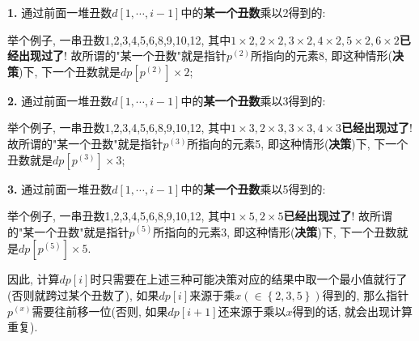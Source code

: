 \documentclass{article}
\begin{document}
\begin{homeworkProblem}
	\textbf{1.} 通过前面一堆丑数$d[1,\cdots,i-1]$中的\textbf{某一个丑数}乘以2得到的:
	
	举个例子, 一串丑数1,2,3,4,5,6,8,9,10,12, 其中$1\times 2,2\times 2, 3\times 2, 4\times 2, 5\times 2, 6 \times 2$\textbf{已经出现过了}! 故所谓的"某一个丑数"就是指针$p^{(2)}$所指向的元素8, 即这种情形(\textbf{决策})下, 下一个丑数就是$dp\left[ p^{\left( 2 \right)} \right] \times 2$; 
	
	\textbf{2.} 通过前面一堆丑数$d[1,\cdots,i-1]$中的\textbf{某一个丑数}乘以3得到的:
	
	举个例子, 一串丑数1,2,3,4,5,6,8,9,10,12, 其中$1\times 3,2\times 3, 3\times 3, 4\times 3$\textbf{已经出现过了}! 故所谓的"某一个丑数"就是指针$p^{(3)}$所指向的元素5, 即这种情形(\textbf{决策})下, 下一个丑数就是$dp\left[ p^{\left( 3 \right)} \right] \times 3$;

	\textbf{3.} 通过前面一堆丑数$d[1,\cdots,i-1]$中的\textbf{某一个丑数}乘以5得到的:

	举个例子, 一串丑数1,2,3,4,5,6,8,9,10,12, 其中$1\times 5,2\times 5$\textbf{已经出现过了}! 故所谓的"某一个丑数"就是指针$p^{(5)}$所指向的元素3, 即这种情形(\textbf{决策})下, 下一个丑数就是$dp\left[ p^{\left( 5 \right)} \right] \times 5$.

	因此, 计算$dp[i]$时只需要在上述三种可能决策对应的结果中取一个最小值就行了(否则就跨过某个丑数了), 如果$dp[i]$来源于乘$x(\in \left\{ 2,3,5 \right\})$得到的, 那么指针$p^{(x)}$需要往前移一位(否则, 如果$dp[i+1]$还来源于乘以$x$得到的话, 就会出现计算重复). 


\end{homeworkProblem}
\end{document}
